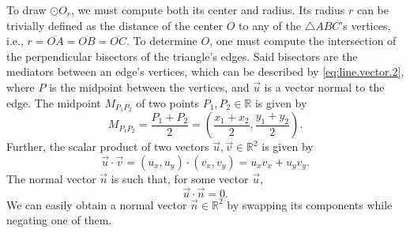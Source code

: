 To draw $\odot O_r$, we must compute both its center and radius.  Its radius $r$
can be trivially defined as the distance of the center $O$ to any of the
$\triangle ABC$'s vertices, i.e., $r = \overline{OA} = \overline{OB} =
\overline{OC}$.  To determine $O$, one must compute the intersection of the
perpendicular bisectors of the triangle's edges.  Said bisectors are the
mediators between an edge's vertices, which can be described by
\eqref{eq:line.vector.2}, where $P$ is the midpoint between the vertices, and
$\vec{u}$ is a vector normal to the edge.  The midpoint $M_{P_1P_2}$ of two
points $P_1, P_2 \in \mathbb{R}$ is given by
%
\begin{equation}\label{eq:midpoint.points.2}
  M_{P_1P_2} = \frac{P_1 + P_2}{2}%
             = (\frac{x_1 + x_2}{2}, \frac{y_1 + y_2}{2}).
\end{equation}
%
Further, the scalar product of two vectors $\vec{u}, \vec{v} \in \mathbb{R}^2$
is given by
%
\begin{equation}\label{eq:vector.dot.2}
  \vec{u} \cdot \vec{v} = (u_x, u_y) \cdot (v_x, v_y) = u_x v_x + u_y v_y.
\end{equation}
%
The normal vector $\vec{n}$ is such that, for some vector $\vec{u}$,
%
\[
  \vec{u} \cdot \vec{n} = 0.
\]
%
We can easily obtain a normal vector $\vec{n} \in \mathbb{R}^2$ by swapping its
components while negating one of them.
%
\textcolor{cyan}{
\begin{comment}{}
This comes as a direct result from applying a rotation transformation of 90
degrees, or $\pi/2$ radians, to $\vec{u}$, like so
%
\[
  \vec{n} = R(\pi/2)\vec{u}%
  = \begin{bmatrix}
      \cos(\pi/2) & -\sin(\pi/2) \\
      \sin(\pi/2) & \cos(\pi/2)
    \end{bmatrix}
    \begin{bmatrix}
      u_1 \\ u_2
    \end{bmatrix}
  = \begin{bmatrix}
      0 & -1 \\
      1 & 0
    \end{bmatrix}
    \begin{bmatrix}
      u_1 \\ u_2
    \end{bmatrix}
  = \begin{bmatrix}
      -u_2 \\ u_1
    \end{bmatrix}.
\]
\end{comment}
}
